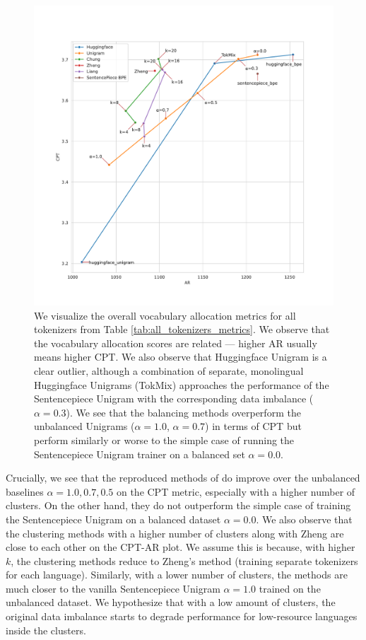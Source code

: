 \begin{figure}
    \centering
    \includegraphics[width=\textwidth]{figures/all_tokenizers_AR_vs_CPT.pdf}
    \caption{We visualize the overall vocabulary allocation metrics for all tokenizers from Table \ref{tab:all_tokenizers_metrics}. We observe that the vocabulary allocation scores are related --- higher AR usually means higher CPT.  We also observe that Huggingface Unigram is a clear outlier, although a combination of separate, monolingual Huggingface Unigrams (TokMix) approaches the performance of the Sentencepiece Unigram with the corresponding data imbalance ($\alpha=0.3$). We see that the balancing methods overperform the unbalanced Unigrams ($\alpha=1.0$, $\alpha=0.7$) in terms of CPT but perform similarly or worse to the simple case of running the Sentencepiece Unigram trainer on a balanced set $\alpha=0.0$.}
    \label{fig:all_tokenizers_AR_vs_CPT}
\end{figure}

Crucially, we see that the reproduced methods of \citet{chung_improving_2020,zheng_allocating_2021,liang_xlm-v_2023} do improve over the unbalanced baselines $\alpha=1.0, 0.7, 0.5$ on the CPT metric, especially with a higher number of clusters. On the other hand, they do not outperform the simple case of training the Sentencepiece Unigram on a balanced dataset $\alpha=0.0$. We also observe that the clustering methods with a higher number of clusters along with Zheng are close to each other on the CPT-AR plot. We assume this is because, with higher $k$, the clustering methods reduce to Zheng's method (training separate tokenizers for each language). Similarly, with a lower number of clusters, the methods are much closer to the vanilla Sentencepiece Unigram $\alpha=1.0$ trained on the unbalanced dataset. We hypothesize that with a low amount of clusters, the original data imbalance starts to degrade performance for low-resource languages inside the clusters.

